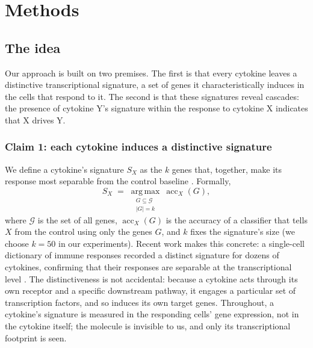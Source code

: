 \documentclass[11pt,a4paper]{article}
\begin{document}
\section{Methods}
\label{sec:methods}

\subsection{The idea}
\label{sec:methods-idea}
Our approach is built on two premises. The first is that every cytokine leaves a distinctive transcriptional signature, a set of genes it characteristically induces in the cells that respond to it. The second is that these signatures reveal cascades: the presence of cytokine Y's signature within the response to cytokine X indicates that X drives Y.

\subsubsection{Claim 1: each cytokine induces a distinctive signature}
\label{sec:claim-signature}
We define a cytokine's signature $S_X$ as the $k$ genes that, together, make its response most separable from the control baseline \citep{golub1999molecular}. Formally,
\[
  S_X \;=\; \operatorname*{arg\,max}_{\substack{G\subseteq\mathcal{G}\\ |G|=k}}\ \operatorname{acc}_{X}(G),
\]
where $\mathcal{G}$ is the set of all genes, $\operatorname{acc}_{X}(G)$ is the accuracy of a classifier that tells $X$ from the control using only the genes $G$, and $k$ fixes the signature's size (we choose $k=50$ in our experiments).
Recent work makes this concrete: a single-cell dictionary of immune responses recorded a distinct signature for dozens of cytokines, confirming that their responses are separable at the transcriptional level \citep{cui2024dictionary}.
The distinctiveness is not accidental: because a cytokine acts through its own receptor and a specific downstream pathway, it engages a particular set of transcription factors, and so induces its own target genes.
Throughout, a cytokine's signature is measured in the responding cells' gene expression, not in the cytokine itself; the molecule is invisible to us, and only its transcriptional footprint is seen.
\end{document}
